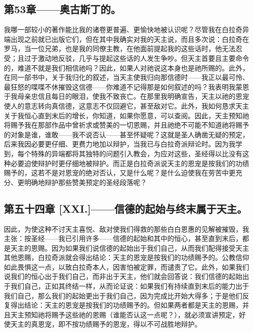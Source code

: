 
\subsection{第53章——奥古斯丁的。}

我哪一部较小的著作能比我的诸卷更普遍、更愉快地被认识呢？尽管我在白拉奇异端出现之前就已出版它们，但在其中我确实对我的天主说，而且多次说：白拉奇在罗马，当一位兄弟，也是我的同僚主教，在他面前提起我的这些话时，他无法忍受；且过于激动地反驳，几乎与提起这些话的人发生争吵。但天主首要且主要命令的，难道不就是我们相信祂吗？因此，如果人对祂说这本身也是祂所赐的。此外，在同一部书中，关于我归化的叙述，当天主使我归向那信德时——我正以最可怜、最狂怒的喋喋不休摧毁这信德——你难道不记得那是如何叙述的吗？我表明我蒙恩于我母亲忠信且每日的眼泪，使我不致丧亡。在那里我明确宣告，天主以祂的恩宠使人的意志转向真信德，这意志不仅回避它，甚至敌对它。此外，我如何恳求天主关于我恒心直到末后的增长，你知道，如果你愿意，可以查阅。因此，天主预知祂将赐予我在那部作品中曾祈求或赞美的一切恩赐，并且祂绝不可能不知道祂将赐予的对象是谁，谁敢——我不说否认——甚至怀疑呢？这就是圣人确凿无疑的预定，后来我因必要更仔细、更费力地加以辩护，当我已与白拉奇派辩论时。因为我学到，每个特殊的异端都将其独特的问题引入教会，为应对这些，圣经得以比没有这种必要迫使辩护时更仔细地被辩护。而正是白拉奇派说天主的恩宠是按我们的功绩赐予的，这若不是对恩宠的绝对否认，又是什么呢？是什么迫使我在劳苦中更充分、更明确地辩护那些赞美预定的圣经段落呢？\par


\subsection{第五十四章 [XXI.]——信德的起始与终末属于天主。}

因此，为使这种不讨天主喜悦、敌对使我们得救的那些白白恩惠的见解被摧毁，我主张：按圣经——我已引用许多——信德的起始和其中的恒心，甚至直到末后，都是天主的恩赐。因为如果我们说信德的起始出于我们自己，从而我们配得接受天主其他恩赐，白拉奇派就会得出结论：天主的恩宠是按我们的功绩赐予的。公教信仰如此畏惧这一点，以致白拉奇本人，因害怕被定罪，而谴责了它。此外，如果我们说我们的恒心出于我们自己，而非出于天主，他们就会回答说：我们信德的起始出于我们自己，正如其终结一样，从而论证说：如果我们有持续直到末后的能力出于我们自己，那么我们的起始更出于我们自己，因为完成比开始大得多；于是他们反复得出结论：天主的恩宠是按我们的功绩赐予的。但如果两者都是天主的恩赐，并且天主预知祂将赐予这些祂的恩赐（谁能否认这一点呢？），就必须宣讲预定，好使天主的真恩宠，即不按功绩赐予的恩宠，得以不可战胜地辩护。\par

